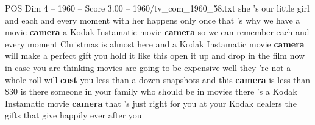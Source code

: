 \begin{textsample}{POS Dim 4 – 1960 – Score 3.00 – 1960/tv\_com\_1960\_58.txt}  \label{ex:f4_pos_005}
she 's our little girl and each and every moment with her happens only once that 's why we have a movie \textbf{camera} a Kodak Instamatic movie \textbf{camera} so we can remember each and every moment Christmas is almost here and a Kodak Instamatic movie \textbf{camera} will make a perfect gift you hold it like this open it up and drop in the film now in case you are thinking movies are going to be expensive well they 're not a whole roll will \textbf{cost} you less than a dozen snapshots and this \textbf{camera} is less than \$30 is there someone in your family who should be in movies there 's a Kodak Instamatic movie \textbf{camera} that 's just right for you at your Kodak dealers the gifts that give happily ever after you

\end{textsample}
